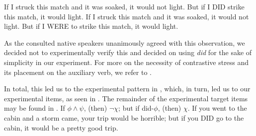 \begin{minipage}{\linewidth}\pex{}
\a{} If I struck this match and it was soaked, it would not light. But if I \MakeUppercase{did} strike this match, it would light.
\a{} If I struck this match and it was soaked, it would not light. But if I \MakeUppercase{were} to strike this match, it would light.
\xe\end{minipage}
As the consulted native speakers unanimously agreed with this observation, we decided not to experimentally verify this and decided on using \textit{did} for the sake of simplicity in our experiment. For more on the necessity of contrastive stress and its placement on the auxiliary verb, we refer to .

    
In total, this led us to the experimental pattern in , which, in turn, led us to our experimental items, as seen in . The remainder of the experimental target items may be found in .
\ex{} {}
    If $\phi\land\psi$, (then) $\neg\chi$; but if did-$\phi$, (then) $\chi$.
\xe
\ex{}
    If you went to the cabin and a storm came, your trip would be horrible; but if you \MakeUppercase{did} go to the cabin, it would be a pretty good trip.
\xe

